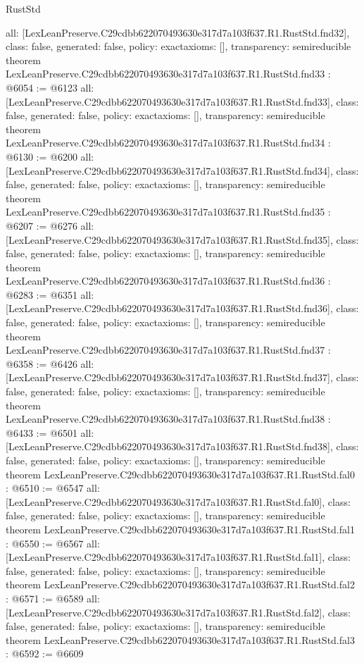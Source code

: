 \begin{lexlean}{RustStd}
\begin{coremodule}
{  all: [LexLeanPreserve.C29cdbb622070493630e317d7a103f637.R1.RustStd.fnd32],
  class: false,
  generated: false,
  policy: exact{axioms: []},
  transparency: semireducible
}
theorem LexLeanPreserve.C29cdbb622070493630e317d7a103f637.R1.RustStd.fnd33 : @6054 := @6123 {
  all: [LexLeanPreserve.C29cdbb622070493630e317d7a103f637.R1.RustStd.fnd33],
  class: false,
  generated: false,
  policy: exact{axioms: []},
  transparency: semireducible
}
theorem LexLeanPreserve.C29cdbb622070493630e317d7a103f637.R1.RustStd.fnd34 : @6130 := @6200 {
  all: [LexLeanPreserve.C29cdbb622070493630e317d7a103f637.R1.RustStd.fnd34],
  class: false,
  generated: false,
  policy: exact{axioms: []},
  transparency: semireducible
}
theorem LexLeanPreserve.C29cdbb622070493630e317d7a103f637.R1.RustStd.fnd35 : @6207 := @6276 {
  all: [LexLeanPreserve.C29cdbb622070493630e317d7a103f637.R1.RustStd.fnd35],
  class: false,
  generated: false,
  policy: exact{axioms: []},
  transparency: semireducible
}
theorem LexLeanPreserve.C29cdbb622070493630e317d7a103f637.R1.RustStd.fnd36 : @6283 := @6351 {
  all: [LexLeanPreserve.C29cdbb622070493630e317d7a103f637.R1.RustStd.fnd36],
  class: false,
  generated: false,
  policy: exact{axioms: []},
  transparency: semireducible
}
theorem LexLeanPreserve.C29cdbb622070493630e317d7a103f637.R1.RustStd.fnd37 : @6358 := @6426 {
  all: [LexLeanPreserve.C29cdbb622070493630e317d7a103f637.R1.RustStd.fnd37],
  class: false,
  generated: false,
  policy: exact{axioms: []},
  transparency: semireducible
}
theorem LexLeanPreserve.C29cdbb622070493630e317d7a103f637.R1.RustStd.fnd38 : @6433 := @6501 {
  all: [LexLeanPreserve.C29cdbb622070493630e317d7a103f637.R1.RustStd.fnd38],
  class: false,
  generated: false,
  policy: exact{axioms: []},
  transparency: semireducible
}
theorem LexLeanPreserve.C29cdbb622070493630e317d7a103f637.R1.RustStd.fal0 : @6510 := @6547 {
  all: [LexLeanPreserve.C29cdbb622070493630e317d7a103f637.R1.RustStd.fal0],
  class: false,
  generated: false,
  policy: exact{axioms: []},
  transparency: semireducible
}
theorem LexLeanPreserve.C29cdbb622070493630e317d7a103f637.R1.RustStd.fal1 : @6550 := @6567 {
  all: [LexLeanPreserve.C29cdbb622070493630e317d7a103f637.R1.RustStd.fal1],
  class: false,
  generated: false,
  policy: exact{axioms: []},
  transparency: semireducible
}
theorem LexLeanPreserve.C29cdbb622070493630e317d7a103f637.R1.RustStd.fal2 : @6571 := @6589 {
  all: [LexLeanPreserve.C29cdbb622070493630e317d7a103f637.R1.RustStd.fal2],
  class: false,
  generated: false,
  policy: exact{axioms: []},
  transparency: semireducible
}
theorem LexLeanPreserve.C29cdbb622070493630e317d7a103f637.R1.RustStd.fal3 : @6592 := @6609 {
}
\end{coremodule}
\end{lexlean}
